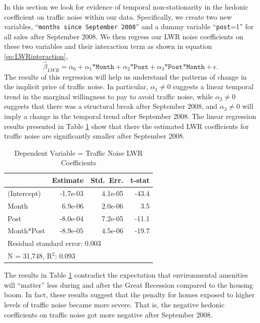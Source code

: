 \documentclass{article}\usepackage{graphicx, color}
\begin{document}
In this section we look for evidence of temporal non-stationarity in the hedonic coefficient on traffic noise within our data. Specifically, we create two new variables, ``\texttt{months since September 2008}'' and a dummy variable ``\texttt{post}=1'' for all sales after September 2008. We then regress our LWR noise coefficients on these two variables and their interaction term as shown in equation \eqref{eq:LWRinteraction}, 
\begin{equation}\label{eq:LWRinteraction}
\hat{\beta}_{LWR} = \alpha _0 + \alpha _1 \texttt{*Month} + \alpha _2  \texttt{*Post} + \alpha _3 \texttt{*Post*Month} + \epsilon.
\end{equation}
The results of this regression will help us understand the patterns of change in the implicit price of traffic noise. In particular, $\alpha_1 \neq 0$ suggests a linear temporal trend in the marginal willingness to pay to avoid traffic noise, while $\alpha_2 \neq 0$ suggests that there was a structural break after September 2008, and $\alpha_3 \neq 0$ will imply a change in the temporal trend after September 2008. The linear regression results presented in Table \ref{tab:betaMAX} show that there the estimated LWR coefficients for traffic noise are significantly smaller after September 2008.
\begin{table}[htb]
\caption{Dependent Variable = Traffic Noise LWR Coefficients}\label{tab:betaMAX}
\begin{center}
\begin{tabular}{lrrr}
           & Estimate & Std.\ Err. & t-stat  \\  \hline
(Intercept) & -1.7e-03 &  4.1e-05 &  -43.4   \\
Month       & 6.9e-06 &  2.0e-06  &   3.5    \\
Post        &-8.0e-04 &  7.2e-05  & -11.1    \\
Month*Post  &-8.9e-05 &  4.5e-06  & -19.7    \\ \hline
\multicolumn{4}{l}{Residual standard error: 0.003} \\
\multicolumn{4}{l}{N = 31,748, R$^2$: 0.093} \\ %
\end{tabular}
\end{center}
\end{table}

The results in Table \ref{tab:betaMAX} contradict the expectation that environmental amenities will ``matter'' less during and after the Great Recession compared to the housing boom. In fact, these results suggest that the penalty for homes exposed to higher levels of traffic noise became more severe. That is, the negative hedonic coefficients on traffic noise got more negative after September 2008.  
\end{document}
